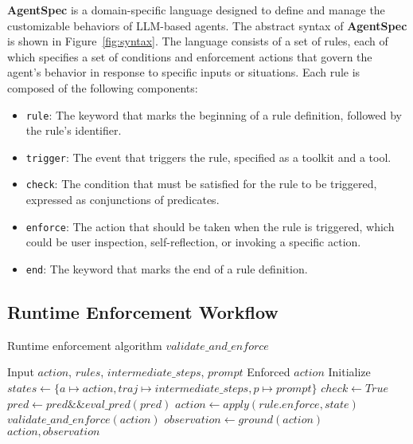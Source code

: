\textbf{AgentSpec} is a domain-specific language designed to define and manage the customizable behaviors of LLM-based agents. 
The abstract syntax of \textbf{AgentSpec} is shown in Figure~\ref{fig:syntax}. 
The language consists of a set of rules, each of which specifies a set of conditions and enforcement actions that govern the agent's behavior in response to specific inputs or situations. 
Each rule is composed of the following components:
\begin{itemize}
    \item \texttt{rule}: The keyword that marks the beginning of a rule definition, followed by the rule's identifier.
    \item \texttt{trigger}: The event that triggers the rule, specified as a toolkit and a tool.
    \item \texttt{check}: The condition that must be satisfied for the rule to be triggered, expressed as conjunctions of predicates.
    \item \texttt{enforce}: The action that should be taken when the rule is triggered, which could be user inspection, self-reflection, or invoking a specific action.
    \item \texttt{end}: The keyword that marks the end of a rule definition.
\end{itemize}

\subsection{Runtime Enforcement Workflow}
\label{alg:workflow}

\begin{algorithm}
\caption{Runtime enforcement algorithm $validate\_and\_enforce$}
\begin{algorithmic}[1]
\REQUIRE Input $action$, $rules$, $intermediate\_steps$, $prompt$
\ENSURE Enforced $action$
    \STATE Initialize $states \gets \{a\mapsto action, traj\mapsto intermediate\_steps, p\mapsto prompt\}$
        \STATE $check \gets True$
        \STATE $pred \gets pred \&\& eval\_pred(pred)$
        \ENDFOR
            \STATE $action \gets apply(rule.enforce, state)$
                \RETURN $validate\_and\_enforce(action)$
            \ENDIF
        \ENDIF
    \ENDIF
\ENDFOR
\STATE $observation \gets ground(action)$ 
\RETURN $action, observation$

\end{algorithmic}
\end{algorithm}

